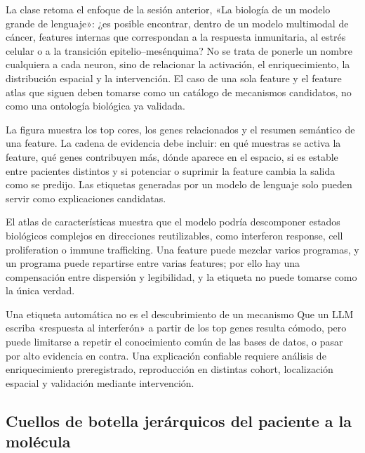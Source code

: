 La clase retoma el enfoque de la sesión anterior, «La biología de un modelo grande de lenguaje»: ¿es posible encontrar, dentro de un modelo multimodal de cáncer, features internas que correspondan a la respuesta inmunitaria, al estrés celular o a la transición epitelio--mesénquima? No se trata de ponerle un nombre cualquiera a cada neuron, sino de relacionar la activación, el enriquecimiento, la distribución espacial y la intervención. El caso de una sola feature y el feature atlas que siguen deben tomarse como un catálogo de mecanismos candidatos, no como una ontología biológica ya validada.


La figura muestra los top cores, los genes relacionados y el resumen semántico de una feature. La cadena de evidencia debe incluir: en qué muestras se activa la feature, qué genes contribuyen más, dónde aparece en el espacio, si es estable entre pacientes distintos y si potenciar o suprimir la feature cambia la salida como se predijo. Las etiquetas generadas por un modelo de lenguaje solo pueden servir como explicaciones candidatas.


El atlas de características muestra que el modelo podría descomponer estados biológicos complejos en direcciones reutilizables, como interferon response, cell proliferation o immune trafficking. Una feature puede mezclar varios programas, y un programa puede repartirse entre varias features; por ello hay una compensación entre dispersión y legibilidad, y la etiqueta no puede tomarse como la única verdad.

\begin{warningbox}{Una etiqueta automática no es el descubrimiento de un mecanismo}
Que un LLM escriba «respuesta al interferón» a partir de los top genes resulta cómodo, pero puede limitarse a repetir el conocimiento común de las bases de datos, o pasar por alto evidencia en contra. Una explicación confiable requiere análisis de enriquecimiento preregistrado, reproducción en distintas cohort, localización espacial y validación mediante intervención.
\end{warningbox}

\subsection{Cuellos de botella jerárquicos del paciente a la molécula}

